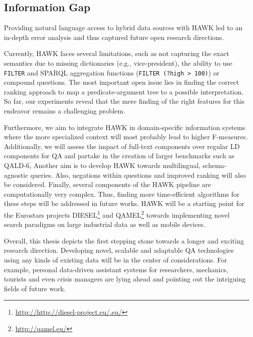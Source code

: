 \subsection*{Information Gap}

Providing natural language access to hybrid data sources with HAWK led to an in-depth error analysis and thus captured future open research directions.

Currently, HAWK faces several limitations, such as not capturing the exact semantics due to missing dictionaries (e.g., vice-president), the ability to use \texttt{FILTER} and SPARQL aggregation functions (\texttt{FILTER (?high > 100)}) or compound questions. 
The most important open issue lies in finding the correct ranking approach to map a predicate-argument tree to a possible interpretation. 
So far, our experiments reveal that the mere finding of the right features for this endeavor remains a challenging problem. 

Furthermore, we aim to integrate HAWK in domain-specific information systems where the more specialized context will most probably lead to higher F-measures. 
Additionally, we will assess the impact of full-text components over regular LD components for \ac{QA} and partake in the creation of larger benchmarks such as \ac{QALD}-6,
Another aim is to develop HAWK towards multilingual, schema-agnostic queries.
Also, negations within questions and improved ranking will also be considered. 
Finally, several components of the HAWK pipeline are computationally very complex. 
Thus, finding more time-efficient algorithms for these steps will be addressed in future works.
HAWK will be a starting point for the Eurostars projects DIESEL\footnote{\url{http://http://diesel-project.eu/.eu/}} and QAMEL\footnote{\url{http://qamel.eu/}} towards implementing novel search paradigms on large industrial data as well as mobile devices.

\bigskip

Overall, this thesis depicts the first stepping stone towards a longer and exciting research direction. 
Developing novel, scalable and adaptable \ac{QA} technologies using any kinds of existing data will be in the center of considerations.
For example, personal data-driven assistant systems for researchers, mechanics, tourists and even crisis managers are lying ahead and pointing out the intriguing fields of future work.